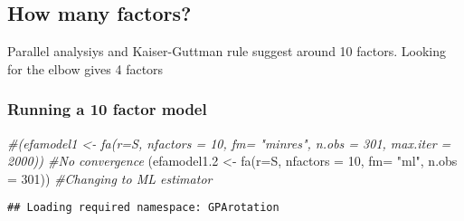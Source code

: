 \documentclass[
]{article}
\newenvironment{Shaded}{\begin{snugshade}}{\end{snugshade}}
\newcommand{\AttributeTok}[1]{\textcolor[rgb]{0.77,0.63,0.00}{#1}}
\newcommand{\CommentTok}[1]{\textcolor[rgb]{0.56,0.35,0.01}{\textit{#1}}}
\newcommand{\DecValTok}[1]{\textcolor[rgb]{0.00,0.00,0.81}{#1}}
\newcommand{\FloatTok}[1]{\textcolor[rgb]{0.00,0.00,0.81}{#1}}
\newcommand{\FunctionTok}[1]{\textcolor[rgb]{0.00,0.00,0.00}{#1}}
\newcommand{\NormalTok}[1]{#1}
\newcommand{\OtherTok}[1]{\textcolor[rgb]{0.56,0.35,0.01}{#1}}
\newcommand{\StringTok}[1]{\textcolor[rgb]{0.31,0.60,0.02}{#1}}
\begin{document}
\hypertarget{how-many-factors}{%
\subsection{How many factors?}\label{how-many-factors}}

Parallel analysiys and Kaiser-Guttman rule suggest around 10 factors.
Looking for the elbow gives 4 factors

\hypertarget{running-a-10-factor-model}{%
\subsubsection{Running a 10 factor
model}\label{running-a-10-factor-model}}

\begin{Shaded}
\begin{Highlighting}[]
\CommentTok{\#(efamodel1 \textless{}{-} fa(r=S, nfactors = 10,  fm= "minres", n.obs = 301, max.iter = 2000)) \#No convergence}
\NormalTok{(efamodel1}\FloatTok{.2} \OtherTok{\textless{}{-}} \FunctionTok{fa}\NormalTok{(}\AttributeTok{r=}\NormalTok{S, }\AttributeTok{nfactors =} \DecValTok{10}\NormalTok{,  }\AttributeTok{fm=} \StringTok{"ml"}\NormalTok{, }\AttributeTok{n.obs =} \DecValTok{301}\NormalTok{)) }\CommentTok{\#Changing to ML estimator}
\end{Highlighting}
\end{Shaded}

\begin{verbatim}
## Loading required namespace: GPArotation
\end{verbatim}
\end{document}
